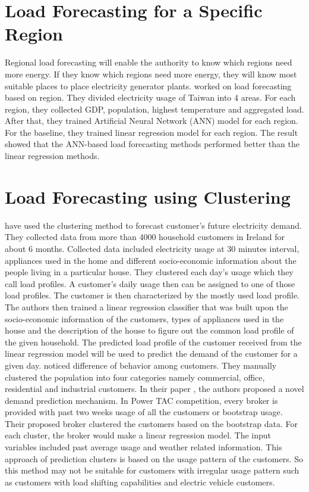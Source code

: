 \section{Load Forecasting for a Specific Region}
Regional load forecasting will enable the authority to know which regions need more energy. If they know which regions need more energy, they will know most suitable places to place electricity generator plants. \cite{hsu2003regional} worked on load forecasting based on region. They divided electricity usage of Taiwan into 4 areas. For each region, they collected GDP,  population, highest temperature and aggregated load. After that, they trained Artificial Neural Network (ANN) model for each region. For the baseline, they trained linear regression model for each region. The result showed that the ANN-based load forecasting methods performed better than the linear regression  methods.


\section {Load Forecasting using Clustering}
\cite{mcloughlin2015clustering} have used the clustering method to forecast customer's future electricity demand. They collected data from more than 4000 household customers in Ireland for about 6 months. Collected data included electricity usage at 30 minutes interval, appliances used in the home and different socio-economic information about the people living in a particular house. They clustered each day's usage which they call load profiles. A customer's daily usage then can be assigned to one of those load profiles. The customer is then characterized by the mostly used load profile. The authors then trained a linear regression classifier that was built upon the socio-economic information of the customers, types of appliances used in the house and the description of the house to figure out the common load profile of the given household. The predicted load profile of the customer received from the linear regression model will be used to predict the demand of the customer for a given day. \cite{cho1995customer} noticed difference of behavior among customers. They manually clustered the population into four categories namely commercial, office, residential and industrial customers. In their paper \cite{wang2015gongbroker}, the authors proposed a novel demand prediction mechanism. In Power TAC competition, every broker is provided with past two weeks usage of all the customers or bootstrap usage. Their proposed broker clustered the customers based on the bootstrap data. For each cluster, the broker would make a linear regression model. The input variables included past average usage and weather related information. This approach of prediction clusters is based on the usage pattern of the customers. So this method may not be suitable for customers with irregular usage pattern such as customers with load shifting capabilities and electric vehicle customers. 


